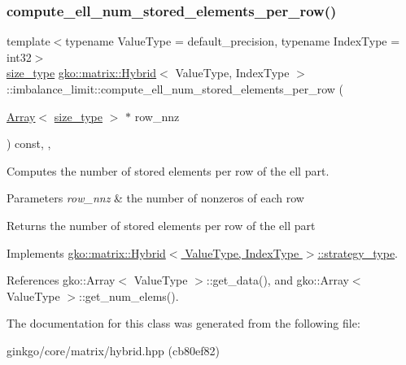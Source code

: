 \subsubsection{\texorpdfstring{compute\+\_\+ell\+\_\+num\+\_\+stored\+\_\+elements\+\_\+per\+\_\+row()}{compute\_ell\_num\_stored\_elements\_per\_row()}}
{\footnotesize\ttfamily template$<$typename Value\+Type = default\+\_\+precision, typename Index\+Type = int32$>$ \\
\hyperlink{namespacegko_a6e5c95df0ae4e47aab2f604a22d98ee7}{size\+\_\+type} \hyperlink{classgko_1_1matrix_1_1Hybrid}{gko\+::matrix\+::\+Hybrid}$<$ Value\+Type, Index\+Type $>$\+::imbalance\+\_\+limit\+::compute\+\_\+ell\+\_\+num\+\_\+stored\+\_\+elements\+\_\+per\+\_\+row (\begin{DoxyParamCaption}\item[{\hyperlink{classgko_1_1Array}{Array}$<$ \hyperlink{namespacegko_a6e5c95df0ae4e47aab2f604a22d98ee7}{size\+\_\+type} $>$ $\ast$}]{row\+\_\+nnz }\end{DoxyParamCaption}) const\hspace{0.3cm}{\ttfamily [inline]}, {\ttfamily [override]}, {\ttfamily [virtual]}}



Computes the number of stored elements per row of the ell part. 


\begin{DoxyParams}{Parameters}
{\em row\+\_\+nnz} & the number of nonzeros of each row\\
\hline
\end{DoxyParams}
\begin{DoxyReturn}{Returns}
the number of stored elements per row of the ell part 
\end{DoxyReturn}


Implements \hyperlink{classgko_1_1matrix_1_1Hybrid_1_1strategy__type_a0a0cd4024f27c7d0f286f35fc0a6de60}{gko\+::matrix\+::\+Hybrid$<$ Value\+Type, Index\+Type $>$\+::strategy\+\_\+type}.



References gko\+::\+Array$<$ Value\+Type $>$\+::get\+\_\+data(), and gko\+::\+Array$<$ Value\+Type $>$\+::get\+\_\+num\+\_\+elems().



The documentation for this class was generated from the following file\+:\begin{DoxyCompactItemize}
\item 
ginkgo/core/matrix/hybrid.\+hpp (cb80ef82)\end{DoxyCompactItemize}
